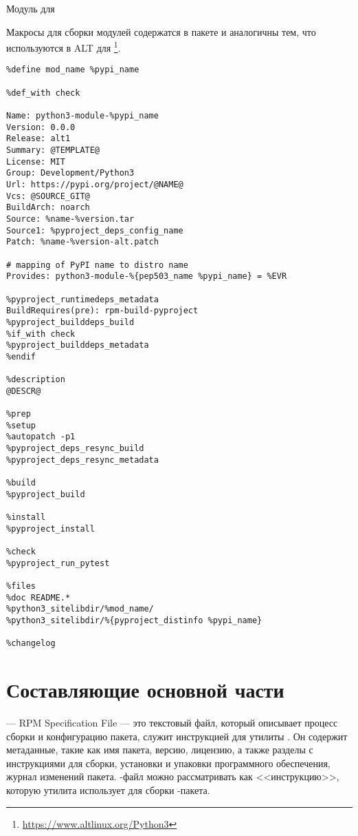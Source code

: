  Модуль для 
	
	Макросы для сборки модулей  содержатся в пакете  и 
	аналогичны тем, что используются в ALT для \footnote{\href{https://www.altlinux.org/Python3}{https://www.altlinux.org/Python3}}.
\begin{Verbatim}[breaklines=true,breakanywhere=true,fontsize=\scriptsize]
%define pypi_name @NAME@
%define mod_name %pypi_name
		
%def_with check
		
Name: python3-module-%pypi_name
Version: 0.0.0
Release: alt1
Summary: @TEMPLATE@
License: MIT
Group: Development/Python3
Url: https://pypi.org/project/@NAME@
Vcs: @SOURCE_GIT@
BuildArch: noarch
Source: %name-%version.tar
Source1: %pyproject_deps_config_name
Patch: %name-%version-alt.patch
		
# mapping of PyPI name to distro name
Provides: python3-module-%{pep503_name %pypi_name} = %EVR
		
%pyproject_runtimedeps_metadata
BuildRequires(pre): rpm-build-pyproject
%pyproject_builddeps_build
%if_with check
%pyproject_builddeps_metadata
%endif
		
%description
@DESCR@
	
%prep
%setup
%autopatch -p1
%pyproject_deps_resync_build
%pyproject_deps_resync_metadata
		
%build
%pyproject_build
		
%install
%pyproject_install
		
%check
%pyproject_run_pytest
		
%files
%doc README.*
%python3_sitelibdir/%mod_name/
%python3_sitelibdir/%{pyproject_distinfo %pypi_name}
		
%changelog
\end{Verbatim}

\section{Составляющие основной части}
 --- RPM Specification File --- это текстовый файл, который описывает 
процесс сборки и конфигурацию пакета, служит инструкцией для утилиты . 
Он содержит метаданные, такие как имя пакета, версию, лицензию, а также разделы с 
инструкциями для сборки, установки и упаковки программного обеспечения, журнал изменений 
пакета. -файл можно рассматривать как <<инструкцию>>, которую утилита  
использует для сборки -пакета. 

